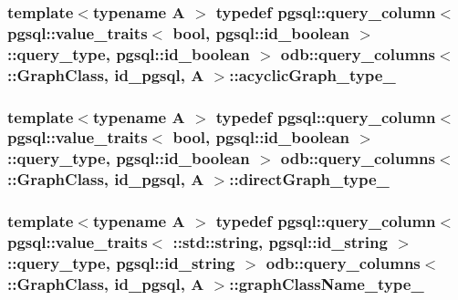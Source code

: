 \subsubsection[{acyclic\+Graph\+\_\+type\+\_\+}]{\setlength{\rightskip}{0pt plus 5cm}template$<$typename A $>$ typedef pgsql\+::query\+\_\+column$<$ pgsql\+::value\+\_\+traits$<$ bool, pgsql\+::id\+\_\+boolean $>$\+::query\+\_\+type, pgsql\+::id\+\_\+boolean $>$ odb\+::query\+\_\+columns$<$ \+::{\bf Graph\+Class}, id\+\_\+pgsql, A $>$\+::{\bf acyclic\+Graph\+\_\+type\+\_\+}}\label{structodb_1_1query__columns_3_01_1_1_graph_class_00_01id__pgsql_00_01_a_01_4_a15c7205e42b439b2a8de75a2e76491a7}
\hypertarget{structodb_1_1query__columns_3_01_1_1_graph_class_00_01id__pgsql_00_01_a_01_4_a3b4293c0e680aa0f73c18e5514533828}{}
\subsubsection[{direct\+Graph\+\_\+type\+\_\+}]{\setlength{\rightskip}{0pt plus 5cm}template$<$typename A $>$ typedef pgsql\+::query\+\_\+column$<$ pgsql\+::value\+\_\+traits$<$ bool, pgsql\+::id\+\_\+boolean $>$\+::query\+\_\+type, pgsql\+::id\+\_\+boolean $>$ odb\+::query\+\_\+columns$<$ \+::{\bf Graph\+Class}, id\+\_\+pgsql, A $>$\+::{\bf direct\+Graph\+\_\+type\+\_\+}}\label{structodb_1_1query__columns_3_01_1_1_graph_class_00_01id__pgsql_00_01_a_01_4_a3b4293c0e680aa0f73c18e5514533828}
\hypertarget{structodb_1_1query__columns_3_01_1_1_graph_class_00_01id__pgsql_00_01_a_01_4_a0998d9f21c582558ae69233ba203660c}{}
\subsubsection[{graph\+Class\+Name\+\_\+type\+\_\+}]{\setlength{\rightskip}{0pt plus 5cm}template$<$typename A $>$ typedef pgsql\+::query\+\_\+column$<$ pgsql\+::value\+\_\+traits$<$ \+::std\+::string, pgsql\+::id\+\_\+string $>$\+::query\+\_\+type, pgsql\+::id\+\_\+string $>$ odb\+::query\+\_\+columns$<$ \+::{\bf Graph\+Class}, id\+\_\+pgsql, A $>$\+::{\bf graph\+Class\+Name\+\_\+type\+\_\+}}\label{structodb_1_1query__columns_3_01_1_1_graph_class_00_01id__pgsql_00_01_a_01_4_a0998d9f21c582558ae69233ba203660c}


